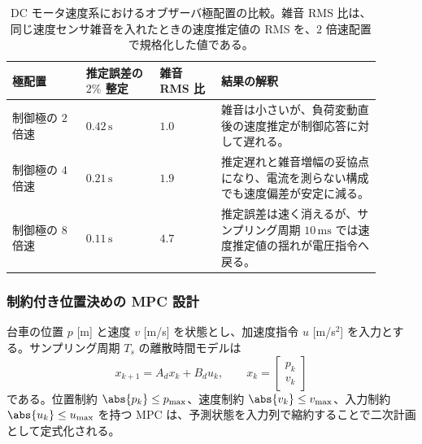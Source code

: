 \begin{table}[tb]
  \centering
  \footnotesize
  \caption{DC モータ速度系におけるオブザーバ極配置の比較。雑音 RMS 比は、同じ速度センサ雑音を入れたときの速度推定値の RMS を、$2$ 倍速配置で規格化した値である。}
  \label{tab:w08-observer-noise-results}
  \begin{tabular}{@{}>{\raggedright\arraybackslash}p{0.18\linewidth}>{\raggedright\arraybackslash}p{0.18\linewidth}>{\raggedright\arraybackslash}p{0.15\linewidth}>{\raggedright\arraybackslash}p{0.39\linewidth}@{}}
    \hline
    極配置 & 推定誤差の $2\%$ 整定 & 雑音 RMS 比 & 結果の解釈 \\
    \hline
    制御極の $2$ 倍速 &
    $0.42\,\mathrm{s}$ &
    $1.0$ &
    雑音は小さいが、負荷変動直後の速度推定が制御応答に対して遅れる。 \\
    制御極の $4$ 倍速 &
    $0.21\,\mathrm{s}$ &
    $1.9$ &
    推定遅れと雑音増幅の妥協点になり、電流を測らない構成でも速度偏差が安定に減る。 \\
    制御極の $8$ 倍速 &
    $0.11\,\mathrm{s}$ &
    $4.7$ &
    推定誤差は速く消えるが、サンプリング周期 $10\,\mathrm{ms}$ では速度推定値の揺れが電圧指令へ戻る。 \\
    \hline
  \end{tabular}
\end{table}

\subsubsection{制約付き位置決めの MPC 設計}

台車の位置 $p$ [m] と速度 $v$ [m/s] を状態とし、加速度指令 $u$ [m/s$^2$] を入力とする。サンプリング周期 $T_s$ の離散時間モデルは
\begin{equation}
  x_{k+1}=A_dx_k+B_du_k,
  \qquad
  x_k=\begin{bmatrix}p_k\\v_k\end{bmatrix}
\end{equation}
である。位置制約 $\abs{p_k}\le p_{\max}$、速度制約 $\abs{v_k}\le v_{\max}$、入力制約 $\abs{u_k}\le u_{\max}$ を持つ MPC は、予測状態を入力列で縮約することで二次計画として定式化される。

